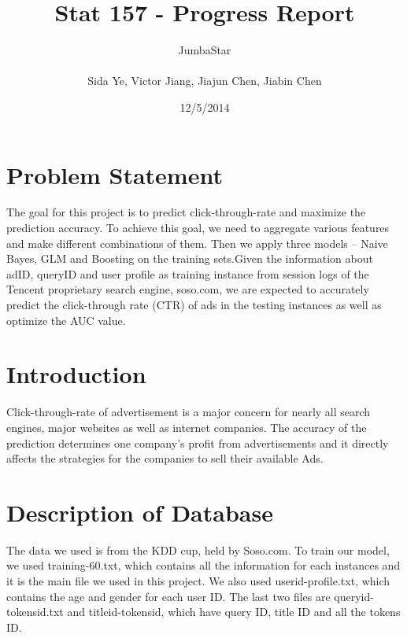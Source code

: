 \documentclass[12pt]{article}
\title{\LARGE \bf  Stat 157 - Progress Report}
\author{ JumbaStar\\
\\ Sida Ye, Victor Jiang, Jiajun Chen, Jiabin Chen}
\date{12/5/2014}
\begin{document}
\maketitle
{}


\section{Problem Statement}
\setlength{\parskip}{0 pt}
The goal for this project is to predict click-through-rate and maximize the prediction accuracy. To achieve this goal, we need to aggregate various features and make different combinations of them. Then we apply three models -- Naive Bayes, GLM and Boosting on the training sets.Given the information about adID, queryID and user profile as training instance from session logs of the Tencent proprietary search engine, soso.com, we are expected to accurately predict the click-through rate (CTR) of ads in the testing instances as well as optimize the AUC value.



\section{Introduction}
\setlength{\parskip}{0 pt}
Click-through-rate of advertisement is a major concern for nearly all search engines, major websites as well as internet companies. The accuracy of the prediction determines one company’s profit from advertisements and it directly affects the strategies for the companies to sell their available Ads. 
\vspace*{-10pt}




\section{Description of Database}
\setlength{\parskip}{0 pt}
The data we used is from the KDD cup, held by Soso.com. To train our model, we used training-60.txt, which contains all the information for each instances and it is the main file we used in this project. We also used userid-profile.txt, which contains the age and gender for each user ID. The last two files are queryid-tokensid.txt and titleid-tokensid, which have query ID, title ID and all the tokens ID. 
\end{document}
